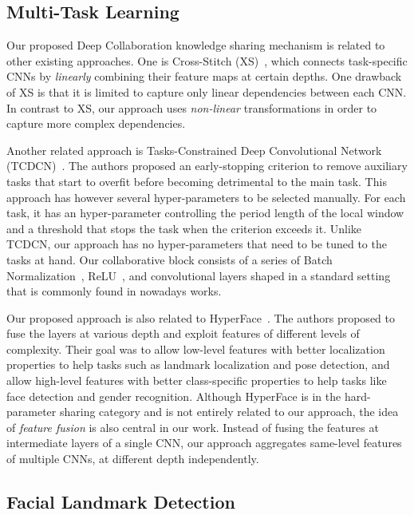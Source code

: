 \documentclass[runningheads]{llncs}
\newcommand{\citep}{\cite}
\begin{document}
\subsection{Multi-Task Learning}
\label{ssec:related-work-mtl}

Our proposed Deep Collaboration knowledge sharing mechanism is related to other existing approaches. One is Cross-Stitch (XS)~\citep{misra2016cross}, which connects task-specific CNNs by \emph{linearly} combining their feature maps at certain depths. One drawback of XS is that it is limited to capture only linear dependencies between each CNN. In contrast to XS, our approach uses \emph{non-linear} transformations in order to capture more complex dependencies. 

Another related approach is Tasks-Constrained Deep Convolutional Network (TCDCN)~\citep{zhang2014facial}. The authors proposed an early-stopping criterion to remove auxiliary tasks that start to overfit before becoming detrimental to the main task. This approach has however several hyper-parameters to be selected manually. For each task, it has an hyper-parameter controlling the period length of the local window and a threshold that stops the task when the criterion exceeds it. Unlike TCDCN, our approach has no hyper-parameters that need to be tuned to the tasks at hand. Our collaborative block consists of a series of Batch Normalization~\citep{ioffe2015batch}, ReLU~\citep{nair2010rectified}, and convolutional layers shaped in a standard setting that is commonly found in nowadays works. 

Our proposed approach is also related to HyperFace~\citep{ranjan2016hyperface}. The authors proposed to fuse the layers at various depth and exploit features of different levels of complexity. Their goal was to allow low-level features with better localization properties to help tasks such as landmark localization and pose detection, and allow high-level features with better class-specific properties to help tasks like face detection and gender recognition. Although HyperFace is in the hard-parameter sharing category and is not entirely related to our approach, the idea of \textit{feature fusion} is also central in our work. Instead of fusing the features at intermediate layers of a single CNN, our approach aggregates same-level features of multiple CNNs, at different depth independently.


\subsection{Facial Landmark Detection}
\label{ssec:related-work-fld}
\end{document}
